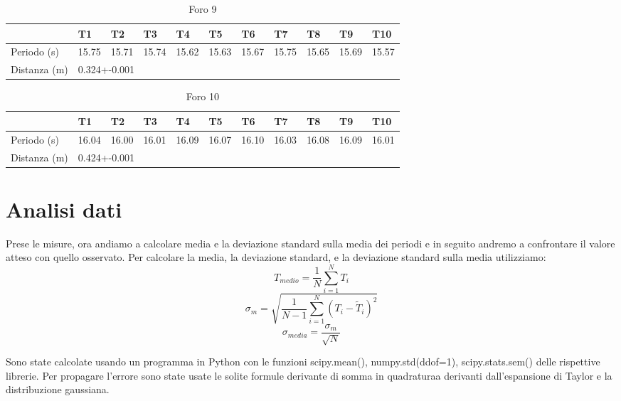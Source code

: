 \documentclass[a4paper,10pt]{article}
\begin{document}
\begin{table}[H]
\centering
\caption{Foro 9}
\label{my-label}
\begin{tabular}{|l|l|l|l|l|l|l|l|l|l|l|}
\hline
             & T1    & T2    & T3    & T4    & T5    & T6    & T7    & T8    & T9    & T10   \\ \hline
Periodo (s)  & 15.75 & 15.71 & 15.74 & 15.62 & 15.63 & 15.67 & 15.75 & 15.65 & 15.69 & 15.57 \\ \hline
Distanza (m) & \multicolumn{10}{l|}{0.324+-0.001}                                             \\ \hline
\end{tabular}
\end{table}
\begin{table}[H]
\centering
\caption{Foro 10}
\label{my-label}
\begin{tabular}{|l|l|l|l|l|l|l|l|l|l|l|}
\hline
             & T1    & T2    & T3    & T4    & T5    & T6    & T7    & T8    & T9    & T10   \\ \hline
Periodo (s)  & 16.04 & 16.00 & 16.01 & 16.09 & 16.07 & 16.10 & 16.03 & 16.08 & 16.09 & 16.01 \\ \hline
Distanza (m) & \multicolumn{10}{l|}{0.424+-0.001}                                             \\ \hline
\end{tabular}
\end{table}
\section{Analisi dati}
Prese le misure, ora andiamo a calcolare media e la deviazione standard sulla media dei periodi e in seguito andremo a confrontare il valore
atteso con quello osservato.
Per calcolare la media, la deviazione standard, e la deviazione standard sulla media utilizziamo:
\begin{equation}
 T_{medio}=\frac{1}{N}\sum_{i=1}^{N}T_i
\end{equation}
\begin{equation}
 \sigma_m=\sqrt{\frac{1}{N-1}\sum_{i=1}^{N}(T_i-{\tilde T_i})^2}
\end{equation}
 \begin{equation}
\sigma_{media}=\frac{\sigma_m}{\sqrt N}
 \end{equation}

Sono state calcolate usando un programma in Python con le funzioni scipy.mean(), numpy.std(ddof=1), scipy.stats.sem() delle rispettive librerie.
Per propagare l'errore sono state usate le solite formule derivante di somma in quadraturaa derivanti dall'espansione di Taylor e la distribuzione gaussiana.
\end{document}
